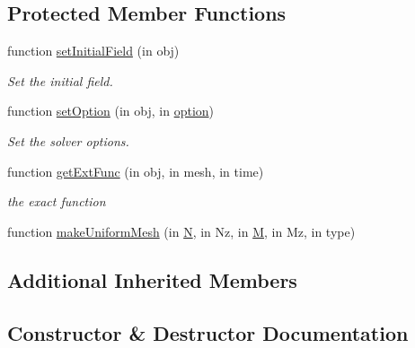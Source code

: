\subsection*{Protected Member Functions}
\begin{DoxyCompactItemize}
\item 
function \hyperlink{class_adv_rotation_uniform_mesh3d_a2c3e442032256f12165438fc9c00d575}{set\+Initial\+Field} (in obj)
\begin{DoxyCompactList}\small\item\em Set the initial field. \end{DoxyCompactList}\item 
function \hyperlink{class_adv_rotation_uniform_mesh3d_a8bc80929475f5be009832e79aafa0eb7}{set\+Option} (in obj, in \hyperlink{class_ndg_phys_af91f4c54b93504e76b38a5693774dff1}{option})
\begin{DoxyCompactList}\small\item\em Set the solver options. \end{DoxyCompactList}\item 
function \hyperlink{class_adv_rotation_uniform_mesh3d_aab4b339aef948b6953eb96eb13594026}{get\+Ext\+Func} (in obj, in mesh, in time)
\begin{DoxyCompactList}\small\item\em the exact function \end{DoxyCompactList}\item 
function \hyperlink{class_adv_rotation_uniform_mesh3d_a213b8e64a7904af872bb0921a4479350}{make\+Uniform\+Mesh} (in \hyperlink{class_adv_rotation_uniform_mesh3d_af59bece2b04f2084c05452a1e55cdd51}{N}, in Nz, in \hyperlink{class_adv_rotation_uniform_mesh3d_a6d00f1706f91651bf193d8a7cb60b643}{M}, in Mz, in type)
\end{DoxyCompactItemize}
\subsection*{Additional Inherited Members}


\subsection{Constructor \& Destructor Documentation}
\mbox{\label{class_adv_rotation_uniform_mesh3d_a847b5d0868c189ea53abdd1dc6246bcf}} 
